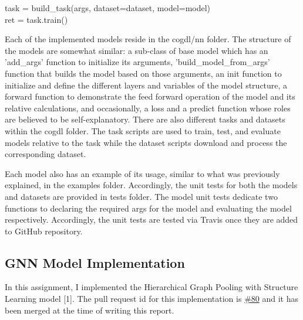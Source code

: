 \documentclass[12pt,a4paper]{article}
\begin{document}
	\vspace{-0.2cm}
	\begin{center}
		task = build\_task(args, dataset=dataset, model=model)\\
		ret = task.train()\\
	\end{center}

	\vspace{-0.2cm}
	\noindent Each of the implemented models reside in the cogdl/nn folder. The structure of the models are somewhat similar: a sub-class of base model which has an 'add\_args' function to initialize its arguments, 'build\_model\_from\_args' function that builds the model based on those arguments, an init function to initialize and define the different layers and variables of the model structure, a forward function to demonstrate the feed forward operation of the model and its relative calculations, and occasionally, a loss and a predict function whose roles are believed to be self-explanatory. There are also different tasks and datasets within the cogdl folder. The task scripts are used to train, test, and evaluate models relative to the task while the dataset scripts download and process the corresponding dataset.
	
	\noindent Each model also has an example of its usage, similar to what was previously explained, in the examples folder. Accordingly, the unit tests for both the models and datasets are provided in tests folder. The model unit tests dedicate two functions to declaring the required args for the model and evaluating the model respectively. Accordingly, the unit tests are tested via Travis once they are added to GitHub repository.
	
		\vspace{-0.3cm}
	\subsection{GNN Model Implementation}
	
	\noindent In this assignment, I implemented the Hierarchical Graph Pooling with Structure Learning model [1]. The pull request id for this implementation is \href{https://github.com/THUDM/cogdl/pull/80}{\#80} and it has been merged at the time of writing this report.
	
		\vspace{-0.3cm}
\end{document}
